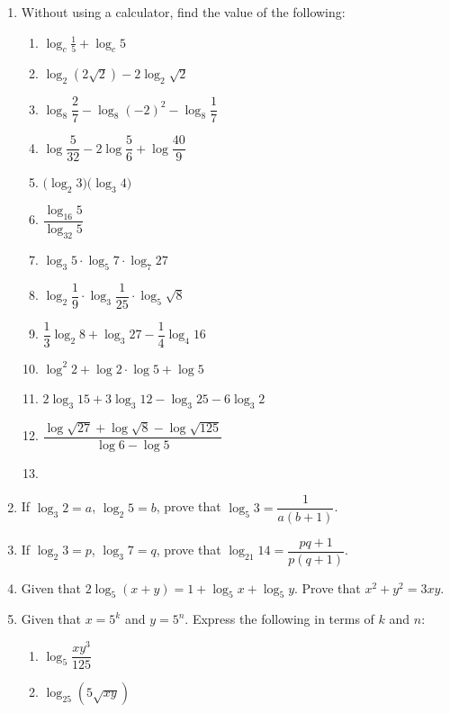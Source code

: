 \documentclass[12pt]{report}
\begin{document}
\begin{multicols}{2}
\begin{enumerate}
    \item Without using a calculator, find the value of the following:
          \begin{enumerate}
            \item $\log_{c}{\frac{1}{5}}+\log_{c}5$
            \item $\log_{2}\left(2{\sqrt{2}}\right)-2\log_{2}{\sqrt{2}}$
            \item $\log_8{\dfrac{2}{7}}-\log_{8}(-2)^{2}-\log_{8}{\dfrac{1}{7}}$
            \item $\log{\dfrac{5}{32}}-2\log{\dfrac{5}{6}}+\log{\dfrac{40}{9}}$
            \item ${\big(}\log_{2}3{\big)}{\big(}\log_{3}4{\big)}$
            \item $\dfrac{\log_{16}5}{\log_{32}5}$
            \item $\log_{3}5\cdot\log_{5}7\cdot\log_{7}27$
            \item $\log_{2}{\dfrac{1}{9}}\cdot\log_{3}{\dfrac{1}{25}}\cdot\log_{5}\sqrt8$
            \item $\dfrac{1}{3}\log_{2}8+\log_{3}27-\dfrac{1}{4}\log_{4}16$
            \item $\log^{2}2+\log2\cdot\log5+\log5$
            \item $2\log_{3}15+3\log_{3}12-\log_{3}25-6\log_{3}2$
            \item ${\dfrac{\log{\sqrt{27}}+\log{\sqrt{8}}-\log{\sqrt{125}}}{\log6-\log5}}$
            \item {}
          \end{enumerate}

    \item If $\log_3 2 = a$, $\log_2 5 = b$, prove that $\log_5 3 = \dfrac{1}{a(b+1)}$.
    \item If $\log_2 3 = p$, $\log_3 7 = q$, prove that $\log_21 14 =
            \dfrac{pq+1}{p(q+1)}$.
    \item Given that $2\log_5(x+y) = 1 + \log_5 x + \log_5 y$. Prove that $x^2 + y^2 =
            3xy$.
    \item Given that $x = 5^k$ and $y = 5^n$. Express the following in terms of $k$ and
          $n$:
          \begin{enumerate}
            \item $\log_{5}{\dfrac{xy^3}{125}}$
            \item $\log_{25}\left(5{\sqrt{xy}}\right)$
          \end{enumerate}


\end{enumerate}
\end{multicols}
\end{document}
